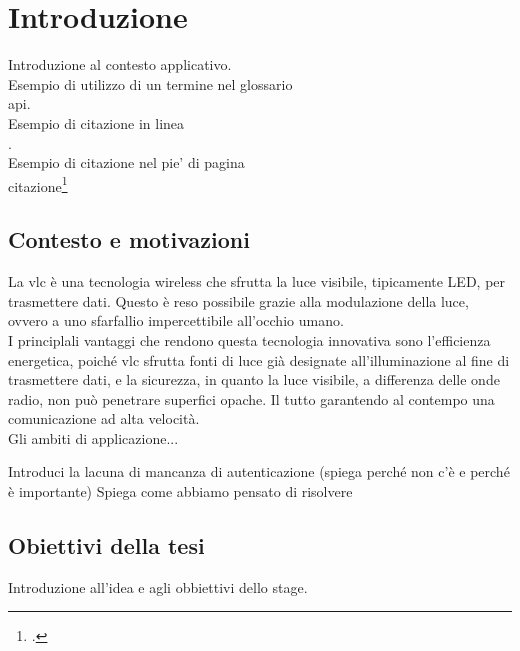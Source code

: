 \chapter{Introduzione}
\label{cap:introduzione}

Introduzione al contesto applicativo.\\

\noindent Esempio di utilizzo di un termine nel glossario \\
\gls{api}. \\

\noindent Esempio di citazione in linea \\
\cite{site:agile-manifesto}. \\

\noindent Esempio di citazione nel pie' di pagina \\
citazione\footcite{womak:lean-thinking} \\

\section{Contesto e motivazioni}
La \gls{vlc} è una tecnologia wireless che sfrutta la luce visibile, tipicamente LED, per trasmettere dati. Questo è reso possibile grazie alla modulazione della luce, ovvero a uno sfarfallio impercettibile all'occhio umano. \\
I principlali vantaggi che rendono questa tecnologia innovativa sono l'efficienza energetica, poiché \gls{vlc} sfrutta fonti di luce già designate all'illuminazione al fine di trasmettere dati, e la sicurezza, in quanto la luce visibile, a differenza delle onde radio, non può penetrare superfici opache. Il tutto garantendo al contempo una comunicazione ad alta velocità.\\
Gli ambiti di applicazione...

Introduci la lacuna di mancanza di autenticazione (spiega perché non c'è e perché è importante)
Spiega come abbiamo pensato di risolvere

\section{Obiettivi della tesi}

Introduzione all'idea e agli obbiettivi dello stage.

